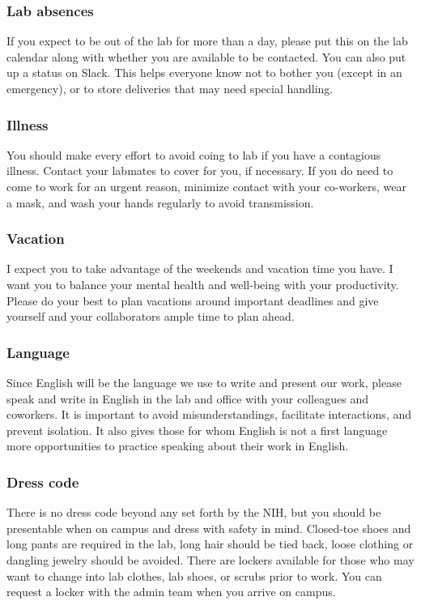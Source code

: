 \documentclass[10pt, letterpaper, twocolumn]{article} %
\begin{document}
\subsubsection{Lab absences} If you expect to be out of the lab for more than a day, please put this on the lab calendar along with whether you are available to be contacted. You can also put up a status on Slack. This helps everyone know not to bother you (except in an emergency), or to store deliveries that may need special handling.

\subsubsection{Illness} You should make every effort to avoid coing to lab if you have a contagious illness. Contact your labmates to cover for you, if necessary. If you do need to come to work for an urgent reason, minimize contact with your co-workers, wear a mask, and wash your hands regularly to avoid transmission.

\subsubsection{Vacation} I expect you to take advantage of the weekends and vacation time you have. I want you to balance your mental health and well-being with your productivity. Please do your best to plan vacations around important deadlines and give yourself and your collaborators ample time to plan ahead.

\subsubsection{Language}
Since English will be the language we use to write and present our work, please speak and write in English in the lab and office with your colleagues and coworkers. It is important to avoid misunderstandings, facilitate interactions, and prevent isolation. It also gives those for whom English is not a first language more opportunities to practice speaking about their work in English.

\subsubsection{Dress code} There is no dress code beyond any set forth by the NIH, but you should be presentable when on campus and dress with safety in mind. Closed-toe shoes and long pants are required in the lab, long hair should be tied back, loose clothing or dangling jewelry should be avoided. There are lockers available for those who may want to change into lab clothes, lab shoes, or scrubs prior to work. You can request a locker with the admin team when you arrive on campus.
\end{document}
